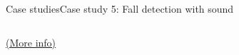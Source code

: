 \documentclass[10pt,compress]{beamer} %
\begin{document}
\begin{frame}{Case studies}{Case study 5: Fall detection with sound}
\begin{columns}
			\centering \href{https://link.springer.com/chapter/10.1007/978-3-319-60042-0_18}{(More info)}
    \end{columns}
\end{frame}
\end{document}
